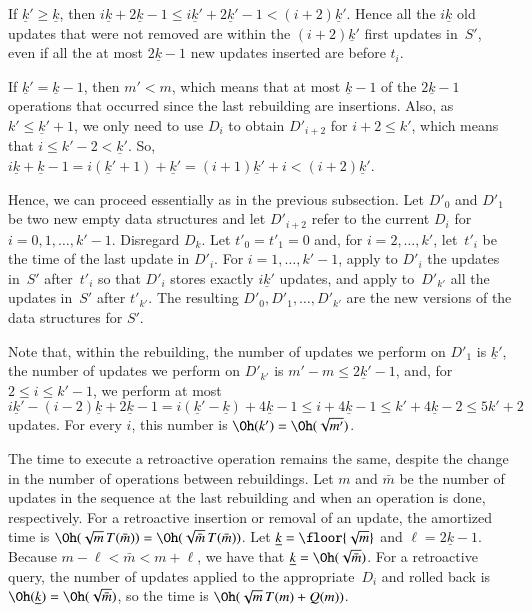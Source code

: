 \documentclass[3p,times,procedia]{elsarticle}
\begin{document}
If $\underline{k}' \geq \underline{k}$, then
$i\underline{k}+2\underline{k}-1 \leq i\underline{k}'+2\underline{k}'-1 < (i+2)\underline{k}'$.
Hence all the $i\underline{k}$ old updates that were not removed 
are within the $(i+2)\underline{k}'$ first updates in~$S'$, 
even if all the at most $2\underline{k}-1$ new updates inserted are before $t_i$. 

If $\underline{k}' = \underline{k}-1$, then $m'<m$, 
which means that at most $\underline{k}-1$ of the $2\underline{k}-1$ 
operations that occurred since the last rebuilding are insertions. 
Also, as $k' \leq \underline{k}'+1$, 
we only need to use $D_i$ to obtain $D'_{i+2}$ for $i+2 \leq k'$, 
which means that $i \leq k'-2 < \underline{k}'$.  
So, $i\underline{k}+\underline{k}-1 = i(\underline{k}'+1)+\underline{k}' 
= (i+1)\underline{k}'+i <  (i+2)\underline{k}'$. 

Hence, we can proceed essentially as in the previous subsection.
Let $D'_0$ and $D'_1$ be two new empty data structures 
and let $D'_{i+2}$ refer to the current $D_i$ for~$i=0,1,\ldots,k'-1$.  Disregard $D_k$.   
Let $t'_0 = t'_1 = 0$ and, for $i=2,\ldots,k'$, 
let~$t'_i$ be the time of the last update in $D'_i$.
For $i=1,\ldots,k'-1$, apply to $D'_i$ the updates in~$S'$ 
after~$t'_i$ so that $D'_i$ stores exactly $i\underline{k}'$ updates, 
and apply to~$D'_{k'}$ all the updates in~$S'$ after $t'_{k'}$. 
The resulting $D'_0,D'_1,\ldots,D'_{k'}$ are the new versions of the data structures for $S'$. 

Note that, within the rebuilding, 
the number of updates we perform on $D'_1$ is $\underline{k}'$, 
the number of updates we perform on $D'_{k'}$ is $m'-m \leq 2\underline{k}'-1$, 
and, for $2 \leq i \leq k'-1$, we perform at most 
$i\underline{k}' - (i-2)\underline{k}+2\underline{k}-1
 = i(\underline{k}'-\underline{k})+4\underline{k}-1 
\leq i+4\underline{k}-1 \leq k'+4\underline{k}-2 \leq 5k'+2$ updates. 
For every $i$, this number is $\Oh(k') = \Oh(\sqrt{m'})$.


The time to execute a retroactive operation remains the same, 
despite the change in the number of operations between rebuildings.
Let $m$ and $\bar{m}$ be the number of updates in the sequence at 
the last rebuilding and when an operation is done, respectively.
For a retroactive insertion or removal of an update, the amortized time 
is $\Oh(\sqrt{m}\,T(\bar{m})) = \Oh(\sqrt{\bar{m}}\,T(\bar{m}))$.  
Let $\underline{k} = \floor{\sqrt{m}}$ and $\ell = 2\underline{k}-1$. 
Because $m-\ell < \bar{m} < m+\ell$, we have that $\underline{k} = \Oh(\sqrt{\bar{m}})$. 
For a retroactive query, the number of updates applied to the 
appropriate~$D_i$ and rolled back is $\Oh(\underline{k}) = \Oh(\sqrt{\bar{m}})$, 
so the time is $\Oh(\sqrt{m}\,T(m)+Q(m))$.  
\end{document}
